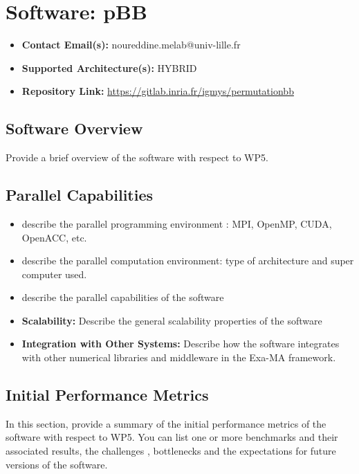 \section{Software: pBB}
\label{sec:WP5:pBB:software}

\begin{itemize}
    \item \textbf{Contact Email(s):} noureddine.melab@univ-lille.fr
    \item \textbf{Supported Architecture(s):} HYBRID
    \item \textbf{Repository Link:} \href{https://gitlab.inria.fr/igmys/permutationbb}{https://gitlab.inria.fr/igmys/permutationbb}
\end{itemize}

\subsection{Software Overview}
\label{sec:WP5:pBB:summary}

Provide a brief overview of the software with respect to WP5.

\subsection{Parallel Capabilities}
\label{sec:WP5:pBB:performances}


\begin{itemize}
    \item describe the parallel programming  environment : MPI, OpenMP, CUDA, OpenACC, etc.
    \item describe the parallel computation environment: type of architecture and super computer used.
    \item describe the parallel capabilities of the software
    \item \textbf{Scalability:} Describe the general scalability properties of the software
    \item \textbf{Integration with Other Systems:} Describe how the software integrates with other numerical libraries and middleware in the Exa-MA framework.
\end{itemize}

\subsection{Initial Performance Metrics}
\label{sec:WP5:pBB:metrics}

In this section, provide a summary of the initial performance metrics of the software with respect to WP5.
You can list one or more benchmarks and their associated results, the challenges , bottlenecks and the expectations for future versions of the software.



